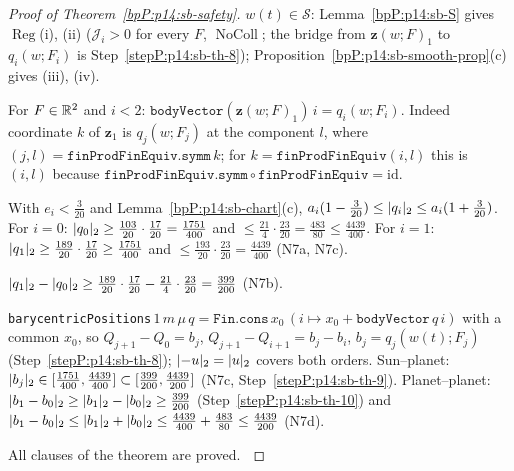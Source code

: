 \begin{proof}[Proof of Theorem~\ref{bpP:p14:sb-safety}]
\label{stepP:p14:sb-th-7} $w(t)\in\mathcal S$: Lemma~\ref{bpP:p14:sb-S} gives $\operatorname{Reg}$(i), (ii) ($\mathcal J_i>0$ for every $F$, $\operatorname{NoColl}$; the bridge from $\mathbf z(w;F)_1$ to $q_i(w;F_i)$ is Step~\ref{stepP:p14:sb-th-8}); Proposition~\ref{bpP:p14:sb-smooth-prop}(c) gives (iii), (iv).

\label{stepP:p14:sb-th-8} For $F\in\mathbb{R}^2$ and $i<2$: $\texttt{bodyVector}(\mathbf z(w;F)_1)\,i=q_i(w;F_i)$. Indeed coordinate $k$ of $\mathbf z_1$ is $q_{j}(w;F_j)$ at the component $l$, where $(j,l)=\texttt{finProdFinEquiv.symm}\,k$; for $k=\texttt{finProdFinEquiv}(i,l)$ this is $(i,l)$ because $\texttt{finProdFinEquiv.symm}\circ\texttt{finProdFinEquiv}=\mathrm{id}$.

\label{stepP:p14:sb-th-9} With $e_i<\frac3{20}$ and Lemma~\ref{bpP:p14:sb-chart}(c), $a_i(1-\frac3{20})\le\lvert q_i\rvert_2\le a_i(1+\frac3{20})$. For $i=0$: $\lvert q_0\rvert_2\ge\frac{103}{20}\cdot\frac{17}{20}=\frac{1751}{400}$ and $\le\frac{21}4\cdot\frac{23}{20}=\frac{483}{80}\le\frac{4439}{400}$. For $i=1$: $\lvert q_1\rvert_2\ge\frac{189}{20}\cdot\frac{17}{20}\ge\frac{1751}{400}$ and $\le\frac{193}{20}\cdot\frac{23}{20}=\frac{4439}{400}$ (N7a, N7c).

\label{stepP:p14:sb-th-10} $\lvert q_1\rvert_2-\lvert q_0\rvert_2\ge\frac{189}{20}\cdot\frac{17}{20}-\frac{21}4\cdot\frac{23}{20}=\frac{399}{200}$ (N7b).

\label{stepP:p14:sb-th-11} \texttt{barycentricPositions}\,$1\,m\,\mu\,q=\texttt{Fin.cons}\,x_0\,(i\mapsto x_0+\texttt{bodyVector}\,q\,i)$ with a common $x_0$, so $Q_{j+1}-Q_0=b_j$, $Q_{j+1}-Q_{i+1}=b_j-b_i$, $b_j=q_j(w(t);F_j)$ (Step~\ref{stepP:p14:sb-th-8}); $\lvert -u\rvert_2=\lvert u\rvert_2$ covers both orders. Sun--planet: $\lvert b_j\rvert_2\in[\frac{1751}{400},\frac{4439}{400}]\subset[\frac{399}{200},\frac{4439}{200}]$ (N7c, Step~\ref{stepP:p14:sb-th-9}). Planet--planet: $\lvert b_1-b_0\rvert_2\ge\lvert b_1\rvert_2-\lvert b_0\rvert_2\ge\frac{399}{200}$ (Step~\ref{stepP:p14:sb-th-10}) and $\lvert b_1-b_0\rvert_2\le\lvert b_1\rvert_2+\lvert b_0\rvert_2\le\frac{4439}{400}+\frac{483}{80}\le\frac{4439}{200}$ (N7d).

All clauses of the theorem are proved. $\qedhere$
\end{proof}

